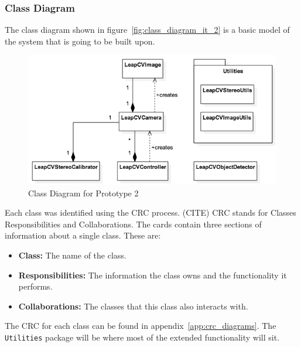 \documentclass[11pt,oneside]{report}
\newcommand\code[1]{\texttt{#1}}
\begin{document}
		\subsubsection{Class Diagram}
		The class diagram shown in figure~\ref{fig:class_diagram_it_2} is a basic model of the system that is going to be built upon.
		\begin{figure}[ht]
		\begin{center}
    			\includegraphics[width=\textwidth]{class_diagram_it_2}
    			\caption{Class Diagram for Prototype 2 \protect {\label{fig:class_diagram_it_2}}}
    		\end{center}
		\end{figure}			
		Each class was identified using the CRC process. (CITE)
		CRC stands for Classes Responsibilities and Collaborations.
		The cards contain three sections of information about a single class.
		These are:
		\begin{itemize}
			\item \textbf{Class:} The name of the class.
			\item \textbf{Responsibilities:} The information the class owns and the functionality it performs.
			\item \textbf{Collaborations:} The classes that this class also interacts with.
		\end{itemize}
		
		The CRC for each class can be found in appendix~\ref{app:crc_diagrams}.
		The \code{Utilities} package will be where most of the extended functionality will sit.
\end{document}

